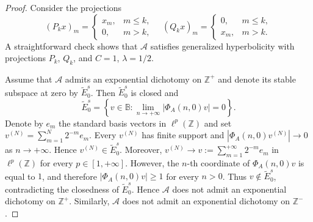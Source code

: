 \documentclass[12pt]{article}
\newcommand{\Bb}{\mathbb{B}}
\newcommand{\Zz}{\mathbb{Z}}
\theoremstyle{definition}
\begin{document}
\begin{proof}
    Consider the projections
    $$
    (P_k x)_m =
\begin{cases}
x_m, & m \leq k, \\
0,   & m > k,
\end{cases}
\quad
    (Q_k x)_m =
\begin{cases}
0, & m \leq k, \\
x_m,   & m > k.
\end{cases}
    $$
A straightforward check shows that $\mathcal{A}$ satisfies generalized hyperbolicity with projections $P_k$, $Q_k$, and $C=1$, $\lambda = 1/2$.


Assume that $\mathcal{A}$ admits an exponential dichotomy on $\Zz^+$ and denote its stable subspace at zero by $\tilde E^s_0$. Then $\tilde E^s_0$ is closed and
$$
\tilde E^s_0=
\left\{v\in\Bb:
\lim_{n\to+\infty}|\Phi_A(n,0)v|=0
\right\}.
$$
Denote by $e_m$ the standard basis vectors in $\ell^p(\Zz)$ and set
$
v^{(N)}=\sum_{m=1}^N2^{-m}e_m.
$
Every $v^{(N)}$ has finite support and
$
|\Phi_A(n,0)v^{(N)}|\to0
$
as $n\to+\infty$. Hence $v^{(N)}\in\tilde E^s_0$. Moreover,
$
v^{(N)}\to v:=\sum_{m=1}^{+\infty}2^{-m}e_m
$
in $\ell^p(\Zz)$ for every $p\in[1,+\infty]$. However, the $n$-th coordinate of $\Phi_A(n,0)v$ is equal to $1$, and therefore
$
|\Phi_A(n,0)v|\geq1
$
for every $n>0$. Thus $v\notin\tilde E^s_0$, contradicting the closedness of $\tilde E^s_0$. Hence $\mathcal{A}$ does not admit an exponential dichotomy on $\Zz^+$. Similarly, $\mathcal{A}$ does not admit an exponential dichotomy on $\Zz^-$.
\end{proof}
\end{document}
